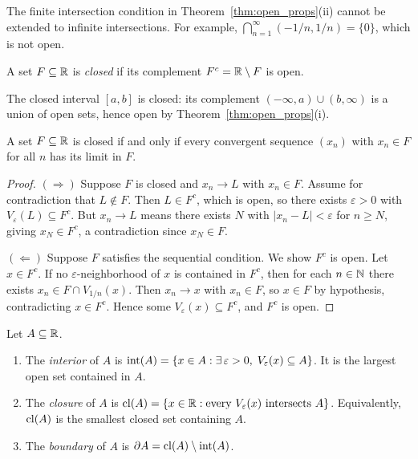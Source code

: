 \documentclass[11pt,a4paper]{article}
\begin{document}
\begin{warning}[title={Infinite intersections of open sets need not be open}]
The finite intersection condition in Theorem~\ref{thm:open_props}(ii)
cannot be extended to infinite intersections.  For example,
$\bigcap_{n=1}^\infty (-1/n, 1/n) = \{0\}$, which is not open.
\end{warning}

\begin{definition}
\label{def:closed}
A set $F \subseteq \mathbb{R}$ is \emph{closed} if its complement
$F^c = \mathbb{R} \setminus F$ is open.
\end{definition}

\begin{example}
\label{ex:closed_interval}
The closed interval $[a, b]$ is closed: its complement
$(-\infty, a) \cup (b, \infty)$ is a union of open sets, hence open by
Theorem~\ref{thm:open_props}(i).
\end{example}

\begin{theorem}
\label{thm:closed_seq}
A set $F \subseteq \mathbb{R}$ is closed if and only if every convergent sequence
$(x_n)$ with $x_n \in F$ for all $n$ has its limit in $F$.
\end{theorem}

\begin{proof}
$(\Rightarrow)$ Suppose $F$ is closed and $x_n \to L$ with $x_n \in F$.
Assume for contradiction that $L \notin F$. Then $L \in F^c$, which is
open, so there exists $\varepsilon > 0$ with
$V_\varepsilon(L) \subseteq F^c$. But $x_n \to L$ means there exists $N$
with $|x_n - L| < \varepsilon$ for $n \ge N$, giving $x_N \in F^c$, a
contradiction since $x_N \in F$.

$(\Leftarrow)$ Suppose $F$ satisfies the sequential condition. We show
$F^c$ is open. Let $x \in F^c$. If no $\varepsilon$-neighborhood of $x$
is contained in $F^c$, then for each $n \in \mathbb{N}$ there exists
$x_n \in F \cap V_{1/n}(x)$. Then $x_n \to x$ with $x_n \in F$, so
$x \in F$ by hypothesis, contradicting $x \in F^c$. Hence some
$V_\varepsilon(x) \subseteq F^c$, and $F^c$ is open.
\end{proof}

\begin{definition}
\label{def:int_cl_bd}
Let $A \subseteq \mathbb{R}$.
\begin{enumerate}[nosep,label=(\roman*)]
  \item The \emph{interior} of $A$ is
    $\operatorname{int}(A) = \{x \in A : \exists\, \varepsilon > 0,\;
    V_\varepsilon(x) \subseteq A\}$. It is the largest open set contained
    in $A$.
  \item The \emph{closure} of $A$ is
    $\operatorname{cl}(A) = \{x \in \mathbb{R} : \text{every } V_\varepsilon(x)
    \text{ intersects } A\}$. Equivalently, $\operatorname{cl}(A)$ is the smallest
    closed set containing $A$.
  \item The \emph{boundary} of $A$ is
    $\partial A = \operatorname{cl}(A) \setminus \operatorname{int}(A)$.
\end{enumerate}
\end{definition}
\end{document}
